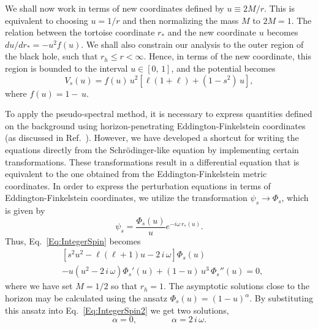 We shall now work in terms of new coordinates defined by $u\equiv2M/r$. This is equivalent to choosing $u=1/r$ and then normalizing the mass $M$ to $2M=1$. The relation between the tortoise coordinate $r_*$ and the new coordinate $u$  becomes $du/dr_*=-u^2f(u)$. We shall also constrain our analysis to the outer region of the black hole, such that $r_h\leq r<\infty$. Hence, in terms of the new coordinate, this region is bounded to the interval $u\in [0,\, 1]$, and the potential becomes
%
\begin{equation}
  V_{s}(u)=f(u)\,u^2\left[\ell\left(1+\ell\right)+\left(1-s^2\right)\,u\right],
\end{equation}
%
where $f(u) = 1- \,u$.

To apply the pseudo-spectral method, it is necessary to express quantities defined on the background using horizon-penetrating Eddington-Finkelstein coordinates (as discussed in Ref.~\cite{qnmspectral}). However, we have developed a shortcut for writing the equations directly from the Schrödinger-like equation by implementing certain transformations. These transformations result in a differential equation that is equivalent to the one obtained from the Eddington-Finkelstein metric coordinates. In order to express the perturbation equations in terms of Eddington-Finkelstein coordinates, we utilize the transformation $\psi_{s}\to \Phi_s$, which is given by
%
\begin{equation}\label{Eq:TransN1}
  \psi_{s}= \frac{\Phi_{s}(u)}{u}e^{-i\omega\,r_*(u)}.
\end{equation}
%
Thus, Eq.~\eqref{Eq:IntegerSpin} becomes
%
\begin{equation}\label{Eq:IntegerSpin2}
  \begin{split}
    &\left[s^2u^2-\ell\left(\ell+1\right)u-2\,i\,\omega\right]\Phi_{s}(u)\\
    &-u\left(u^2-2\,i\,\omega\right)\Phi_{s}'(u)+\left(1-u\right)\,u^3\,\Phi_{s}''(u)=0,\end{split}
\end{equation}
%
where we have set $M=1/2$ so that $r_h=1$. The asymptotic solutions close to the horizon may be calculated using the ansatz $\Phi_{s}(u)=(1-u)^{\alpha}$. By substituting this ansatz into Eq.~\eqref{Eq:IntegerSpin2} we get two solutions,
%
\begin{equation}\label{Eq:AsympHorion}
  \alpha=0,\qquad\qquad \alpha=2\,i\,\omega.
\end{equation}
